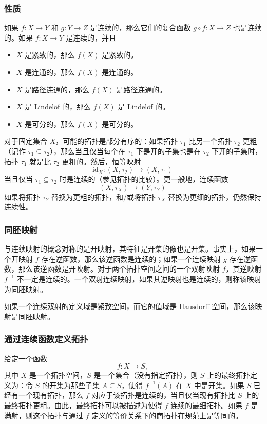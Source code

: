 \subsubsection{性质}
如果 $f: X \to Y$ 和 $g: Y \to Z$ 是连续的，那么它们的复合函数 $g \circ f: X \to Z$ 也是连续的。如果 $f: X \to Y$ 是连续的，并且
\begin{itemize}
\item $X$ 是紧致的，那么 $f(X)$ 是紧致的。
\item $X$ 是连通的，那么 $f(X)$ 是连通的。
\item $X$ 是路径连通的，那么 $f(X)$ 是路径连通的。
\item $X$ 是 Lindelöf 的，那么 $f(X)$ 是 Lindelöf 的。
\item $X$ 是可分的，那么 $f(X)$ 是可分的。
\end{itemize}
对于固定集合 $X$，可能的拓扑是部分有序的：如果拓扑 $\tau_1$ 比另一个拓扑 $\tau_2$ 更粗（记作 $\tau_1 \subseteq \tau_2$），那么当且仅当每个在 $\tau_1$ 下是开的子集也是在 $\tau_2$ 下开的子集时，拓扑 $\tau_1$ 就是比 $\tau_2$ 更粗的。然后，恒等映射
$$
\text{id}_X: (X, \tau_2) \to (X, \tau_1)~
$$
当且仅当 $\tau_1 \subseteq \tau_2$ 时是连续的（参见拓扑的比较）。更一般地，连续函数
$$
(X, \tau_X) \to (Y, \tau_Y)~
$$
如果将拓扑 $\tau_Y$ 替换为更粗的拓扑，和/或将拓扑 $\tau_X$ 替换为更细的拓扑，仍然保持连续性。
\subsubsection{同胚映射}
与连续映射的概念对称的是开映射，其特征是开集的像也是开集。事实上，如果一个开映射 $f$ 存在逆函数，那么该逆函数是连续的；如果一个连续映射 $g$ 存在逆函数，那么该逆函数是开映射。对于两个拓扑空间之间的一个双射映射 $f$，其逆映射 $f^{-1}$ 不一定是连续的。一个双射连续映射，如果其逆映射也是连续的，则称该映射为同胚映射。

如果一个连续双射的定义域是紧致空间，而它的值域是 Hausdorff 空间，那么该映射是同胚映射。
\subsubsection{通过连续函数定义拓扑}
给定一个函数
$$
f \colon X \rightarrow S,~
$$
其中 $X$ 是一个拓扑空间，$S$ 是一个集合（没有指定拓扑），则 $S$ 上的最终拓扑定义为：令 $S$ 的开集为那些子集 $A \subseteq S$，使得 $f^{-1}(A)$ 在 $X$ 中是开集。如果 $S$ 已经有一个现有拓扑，那么 $f$ 对应于该拓扑是连续的，当且仅当现有拓扑比 $S$ 上的最终拓扑更粗。由此，最终拓扑可以被描述为使得 $f$ 连续的最细拓扑。如果 $f$ 是满射，则这个拓扑与通过 $f$ 定义的等价关系下的商拓扑在规范上是等同的。

